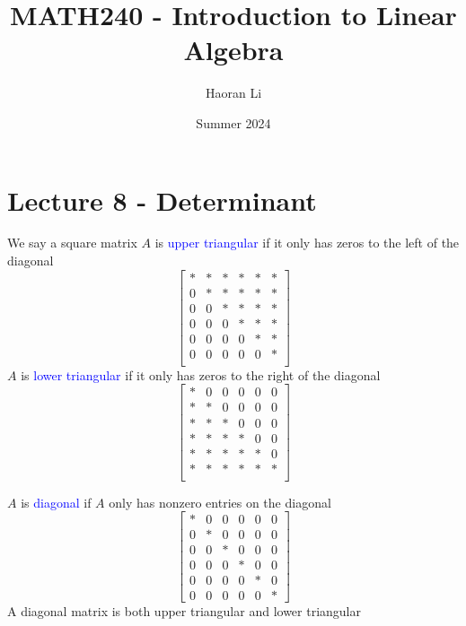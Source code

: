 \documentclass{beamer}
\title{MATH240 - Introduction to Linear Algebra}
\author{Haoran Li}
\institute[UMD]{University of Maryland, College Park}
\date{Summer 2024}
\theoremstyle{definition}
\theoremstyle{remark}
\begin{document}
\maketitle

\section{Lecture 8 - Determinant}

\begin{frame}[t]
\begin{definition}
We say a square matrix $A$ is \textcolor{blue}{upper triangular} if it only has zeros to the left of the diagonal
\[
\begin{bmatrix}
*&*&*&*&*&*\\
0&*&*&*&*&*\\
0&0&*&*&*&*\\
0&0&0&*&*&*\\
0&0&0&0&*&*\\
0&0&0&0&0&*\\
\end{bmatrix}
\]\pause
$A$ is \textcolor{blue}{lower triangular} if it only has zeros to the right of the diagonal
\[
\begin{bmatrix}
*&0&0&0&0&0\\
*&*&0&0&0&0\\
*&*&*&0&0&0\\
*&*&*&*&0&0\\
*&*&*&*&*&0\\
*&*&*&*&*&*\\
\end{bmatrix}
\]
\end{definition}
\end{frame}

\begin{frame}[t]
\begin{definition}
$A$ is \textcolor{blue}{diagonal} if $A$ only has nonzero entries on the diagonal
\[
\begin{bmatrix}
*&0&0&0&0&0\\
0&*&0&0&0&0\\
0&0&*&0&0&0\\
0&0&0&*&0&0\\
0&0&0&0&*&0\\
0&0&0&0&0&*
\end{bmatrix}
\]\pause
A diagonal matrix is both upper triangular and lower triangular
\end{definition}
\end{frame}
\end{document}
